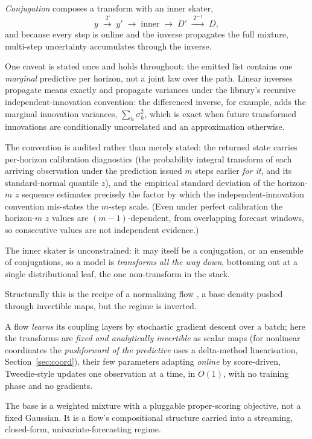 \documentclass[article]{jss}
\begin{document}
\emph{Conjugation} composes a transform with
an inner skater,
\[
y \;\xrightarrow{\;T\;}\; y' \;\to\; \text{inner} \;\to\; D'
  \;\xrightarrow{\;T^{-1}\;}\; D ,
\]
and because every step is online and the inverse propagates the full mixture,
multi-step uncertainty accumulates through the inverse.

One caveat is stated
once and holds throughout: the emitted list contains one \emph{marginal}
predictive per horizon, not a joint law over the path. Linear inverses propagate
means exactly and propagate variances under the library's recursive
independent-innovation convention: the differenced inverse, for example, adds
the marginal innovation variances, $\sum_{h}\sigma_h^2$, which is exact when
future transformed innovations are conditionally uncorrelated and an
approximation otherwise.

The convention is audited rather than merely stated:
the returned state carries per-horizon calibration diagnostics (the
probability integral transform of each arriving observation under the
prediction issued $m$ steps earlier \emph{for it}, and its standard-normal
quantile $z$), and the empirical standard deviation of the horizon-$m$ $z$
sequence estimates precisely the factor by which the independent-innovation
convention mis-states the $m$-step scale. (Even under perfect calibration the
horizon-$m$ $z$ values are $(m{-}1)$-dependent, from overlapping forecast
windows, so consecutive values are not independent evidence.)

The inner skater is unconstrained: it may
itself be a conjugation, or an ensemble of conjugations, so a model is
\emph{transforms all the way down}, bottoming out at a single distributional leaf,
the one non-transform in the stack.

Structurally this is the recipe of a normalizing flow
\citep{rezende2015variational}, a base density pushed through invertible maps,
but the regime is inverted.

A flow \emph{learns} its coupling layers by
stochastic gradient descent over a batch; here the transforms are \emph{fixed and
analytically invertible} as scalar maps (for nonlinear coordinates the
\emph{pushforward of the predictive} uses a delta-method linearisation,
Section~\ref{sec:coord}), their few parameters adapting \emph{online} by
score-driven, Tweedie-style updates \citep{creal2013generalized} one observation
at a time, in $O(1)$, with no training phase and no gradients.

The base is a
weighted mixture with a pluggable proper-scoring objective, not a fixed Gaussian.
It is a flow's compositional structure carried into a streaming, closed-form,
univariate-forecasting regime.
\end{document}

